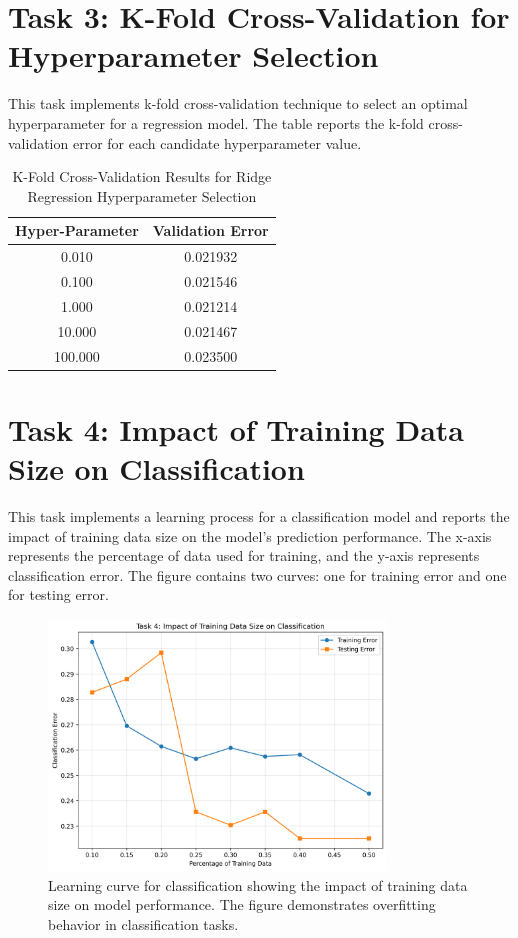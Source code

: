 \documentclass[letterpaper,11pt,twoside]{article}
\begin{document}
\newpage

\section{Task 3: K-Fold Cross-Validation for Hyperparameter Selection}

This task implements k-fold cross-validation technique to select an optimal hyperparameter for a regression model. The table reports the k-fold cross-validation error for each candidate hyperparameter value.

    \begin{table}[h]
    \centering
    \begin{tabular}{|c|c|}
        \hline
        \textbf{Hyper-Parameter} & \textbf{Validation Error} \\
        \hline
        0.010 & 0.021932 \\
        0.100 & 0.021546 \\
        1.000 & 0.021214 \\
        10.000 & 0.021467 \\
        100.000 & 0.023500 \\
        \hline
    \end{tabular}
    \caption{K-Fold Cross-Validation Results for Ridge Regression Hyperparameter Selection}
    \label{tab:task3}
\end{table}

\newpage

\section{Task 4: Impact of Training Data Size on Classification}

This task implements a learning process for a classification model and reports the impact of training data size on the model's prediction performance. The x-axis represents the percentage of data used for training, and the y-axis represents classification error. The figure contains two curves: one for training error and one for testing error.

\begin{figure}[h]
    \centering
    \includegraphics[width=0.8\textwidth]{../Figures/Figure3.png}
    \caption{Learning curve for classification showing the impact of training data size on model performance. The figure demonstrates overfitting behavior in classification tasks.}
    \label{fig:task4}
\end{figure}
\end{document}
